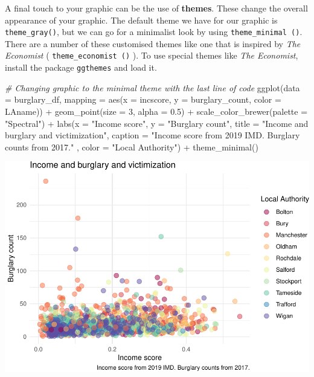 \documentclass[
]{book}
\newenvironment{Shaded}{\begin{snugshade}}{\end{snugshade}}
\newcommand{\AttributeTok}[1]{\textcolor[rgb]{0.77,0.63,0.00}{#1}}
\newcommand{\CommentTok}[1]{\textcolor[rgb]{0.56,0.35,0.01}{\textit{#1}}}
\newcommand{\DecValTok}[1]{\textcolor[rgb]{0.00,0.00,0.81}{#1}}
\newcommand{\FloatTok}[1]{\textcolor[rgb]{0.00,0.00,0.81}{#1}}
\newcommand{\FunctionTok}[1]{\textcolor[rgb]{0.00,0.00,0.00}{#1}}
\newcommand{\NormalTok}[1]{#1}
\newcommand{\SpecialCharTok}[1]{\textcolor[rgb]{0.00,0.00,0.00}{#1}}
\newcommand{\StringTok}[1]{\textcolor[rgb]{0.31,0.60,0.02}{#1}}
\begin{document}
A final touch to your graphic can be the use of \textbf{themes}. These change the overall appearance of your graphic. The default theme we have for our graphic is \texttt{theme\_gray()}, but we can go for a minimalist look by using \texttt{theme\_minimal\ ()}. There are a number of these customised themes like one that is inspired by \emph{The Economist} ( \texttt{theme\_economist\ ()} ). To use special themes like \emph{The Economist}, install the package \texttt{ggthemes} and load it.

\begin{Shaded}
\begin{Highlighting}[]
\CommentTok{\# Changing graphic to the minimal theme with the last line of code}
\FunctionTok{ggplot}\NormalTok{(}\AttributeTok{data =}\NormalTok{ burglary\_df, }\AttributeTok{mapping =} \FunctionTok{aes}\NormalTok{(}\AttributeTok{x =}\NormalTok{ incscore, }\AttributeTok{y =}\NormalTok{ burglary\_count, }\AttributeTok{color =}\NormalTok{ LAname)) }\SpecialCharTok{+} 
  \FunctionTok{geom\_point}\NormalTok{(}\AttributeTok{size =} \DecValTok{3}\NormalTok{, }\AttributeTok{alpha =} \FloatTok{0.5}\NormalTok{) }\SpecialCharTok{+} 
  \FunctionTok{scale\_color\_brewer}\NormalTok{(}\AttributeTok{palette =} \StringTok{"Spectral"}\NormalTok{) }\SpecialCharTok{+} 
  \FunctionTok{labs}\NormalTok{(}\AttributeTok{x =} \StringTok{"Income score"}\NormalTok{, }\AttributeTok{y =} \StringTok{"Burglary count"}\NormalTok{, }\AttributeTok{title =} \StringTok{"Income and burglary and victimization"}\NormalTok{, }\AttributeTok{caption =} \StringTok{"Income score from 2019 IMD. Burglary counts from 2017."}\NormalTok{ , }\AttributeTok{color =} \StringTok{"Local Authority"}\NormalTok{) }\SpecialCharTok{+} 
  \FunctionTok{theme\_minimal}\NormalTok{()}
\end{Highlighting}
\end{Shaded}

\includegraphics{03-data-visualisation_files/figure-latex/unnamed-chunk-12-1.pdf}
\end{document}
